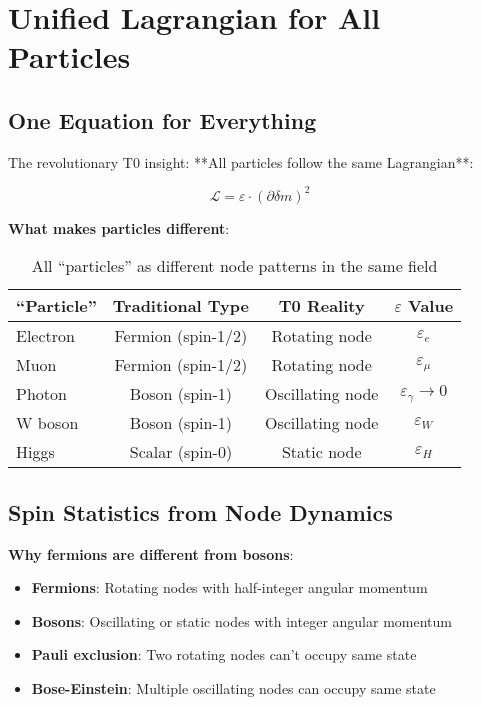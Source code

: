 \documentclass[12pt,a4paper]{article}
\newcommand{\Lag}{\mathcal{L}}
\newcommand{\deltam}{\delta m}
\theoremstyle{definition}
\theoremstyle{remark}
\begin{document}
	\section{Unified Lagrangian for All Particles}
	
	\subsection{One Equation for Everything}
	
	The revolutionary T0 insight: **All particles follow the same Lagrangian**:
	
	\begin{equation}
		\boxed{\Lag = \varepsilon \cdot (\partial \deltam)^2}
		\label{eq:universal_lagrangian}
	\end{equation}
	
	\textbf{What makes particles different}:
	
	\begin{table}[htbp]
		\centering
		\begin{tabular}{lccc}
			\toprule
			\textbf{``Particle''} & \textbf{Traditional Type} & \textbf{T0 Reality} & \textbf{$\varepsilon$ Value} \\
			\midrule
			Electron & Fermion (spin-1/2) & Rotating node & $\varepsilon_e$ \\
			Muon & Fermion (spin-1/2) & Rotating node & $\varepsilon_\mu$ \\
			Photon & Boson (spin-1) & Oscillating node & $\varepsilon_\gamma \to 0$ \\
			W boson & Boson (spin-1) & Oscillating node & $\varepsilon_W$ \\
			Higgs & Scalar (spin-0) & Static node & $\varepsilon_H$ \\
			\bottomrule
		\end{tabular}
		\caption{All ``particles'' as different node patterns in the same field}
		\label{tab:unified_particles}
	\end{table}
	
	\subsection{Spin Statistics from Node Dynamics}
	
	\textbf{Why fermions are different from bosons}:
	
	\begin{itemize}
		\item \textbf{Fermions}: Rotating nodes with half-integer angular momentum
		\item \textbf{Bosons}: Oscillating or static nodes with integer angular momentum
		\item \textbf{Pauli exclusion}: Two rotating nodes can't occupy same state
		\item \textbf{Bose-Einstein}: Multiple oscillating nodes can occupy same state
	\end{itemize}
	
\end{document}
